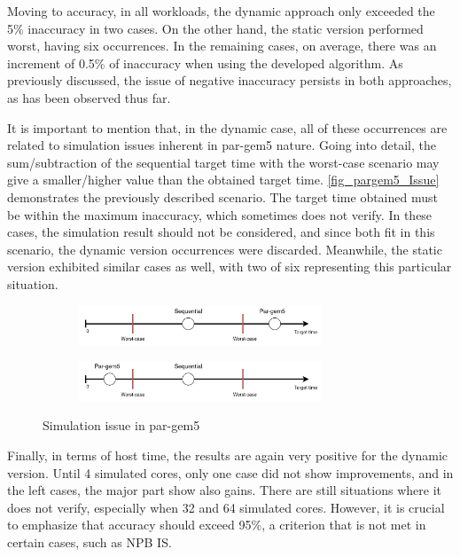 Moving to accuracy, in all workloads, the dynamic approach only exceeded the 5\% inaccuracy in two cases. On the other hand, the static 
version performed worst, having six occurrences. In the remaining cases, on average, there was an increment of 0.5\% of inaccuracy when 
using the developed algorithm. As previously discussed, the issue of negative inaccuracy persists in both approaches, as has been observed thus far.

It is important to mention that, in the dynamic case, all of these occurrences are related to 
simulation issues inherent in par-gem5 nature. Going into detail, the sum/subtraction of the sequential target time with the 
worst-case scenario may give a smaller/higher value than the obtained target time. \autoref{fig_pargem5_Issue} demonstrates the previously described 
scenario. The target time obtained must be within the maximum inaccuracy, which sometimes does not verify. In these cases, the simulation result 
should not be considered, and since both fit in this scenario, the dynamic version occurrences were discarded. Meanwhile, the static 
version exhibited similar cases as well, with two of six representing this particular situation. 

\begin{figure}[H]
    \centering
    \begin{subfigure}{\textwidth}
        \centering
        \includegraphics[width=0.8\textwidth]{Images/pargem5_Issue1.png}
    \end{subfigure}
    \begin{subfigure}{\textwidth}
        \centering
        \includegraphics[width=0.8\textwidth]{Images/pargem5_Issue2.png}
    \end{subfigure}

    \caption{Simulation issue in par-gem5}
	\label{fig_pargem5_Issue}
\end{figure}

Finally, in terms of host time, the results are again very positive for the dynamic version. Until 4 simulated cores, only one case did not 
show improvements, and in the left cases, the major part show also gains. There are still situations where it does not verify, 
especially when 32 and 64 simulated cores. However, it is crucial to emphasize that accuracy should exceed 95\%, a criterion that is 
not met in certain cases, such as NPB IS.




